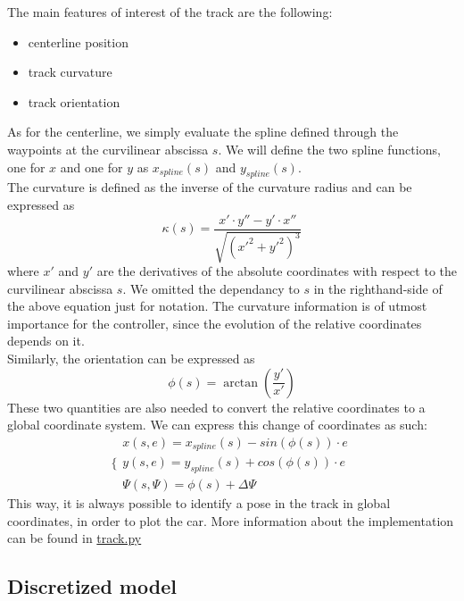 \documentclass[a4paper, onecolumn, 11pt]{article}
\begin{document}
The main features of interest of the track are the following:
\begin{itemize}
    \item centerline position
    \item track curvature
    \item track orientation
\end{itemize}
As for the centerline, we simply evaluate the spline defined through the
waypoints at the curvilinear abscissa $s$. We will define the two spline
functions, one for $x$ and one for $y$ as $x_{spline}(s)$ and $y_{spline}(s)$.\\
The curvature is defined as the inverse of the curvature radius and can be
expressed as
\begin{equation}
    \kappa(s) = \frac{x' \cdot y'' - y' \cdot x''}{\sqrt{(x'^2 + y'^2)^3}}
\end{equation}
where $x'$ and $y'$ are the derivatives of the absolute coordinates with respect
to the curvilinear abscissa $s$. We omitted the dependancy to $s$ in the
righthand-side of the above equation just for notation. The curvature
information is of utmost importance for the controller, since the evolution of
the relative coordinates depends on it. \\
Similarly, the orientation can be expressed as
\begin{equation}
    \phi(s) = \arctan\left(\frac{y'}{x'}\right)
\end{equation}
These two quantities are also needed to convert the relative coordinates to a
global coordinate system. We can express this change of coordinates as such:
\begin{equation}
    \Bigg\{
        \begin{array}{ll}
            x(s,e) =  x_{spline}(s) - sin(\phi(s)) \cdot e\\
            y(s,e) =  y_{spline}(s) + cos(\phi(s)) \cdot e\\
            \varPsi(s,\varPsi) = \phi(s) + \Delta \varPsi
        \end{array}
\end{equation}
This way, it is always possible to identify a pose in the track in global
coordinates, in order to plot the car. More information about the implementation
can be found in
\href{https://github.com/neverorfrog/vehicle-control/blob/main/environment/track.py}{track.py}


\subsection{Discretized model}
\end{document}

